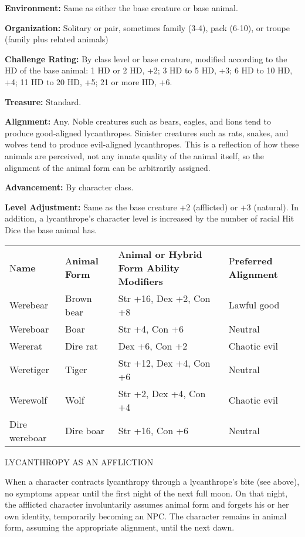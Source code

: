 \documentclass{article}
\begin{document}
\textbf{Environment:} Same as either the base creature or base animal.

\textbf{Organization:} Solitary or pair, sometimes family (3-4), pack (6-10), or 
troupe (family plus related animals)

\textbf{Challenge Rating:} By class level or base creature, modified according 
to the HD of the base animal: 1 HD or 2 HD, +2; 3 HD to 5 HD, +3; 6 HD to 10 HD, 
+4; 11 HD to 20 HD, +5; 21 or more HD, +6.

\textbf{Treasure:} Standard.

\textbf{Alignment:} Any. Noble creatures such as bears, eagles, and lions tend 
to produce good-aligned lycanthropes. Sinister creatures such as rats, snakes, 
and wolves tend to produce evil-aligned lycanthropes. This is a reflection of how 
these animals are perceived, not any innate quality of the animal itself, so the 
alignment of the animal form can be arbitrarily assigned.

\textbf{Advancement:} By character class.

\textbf{Level Adjustment:} Same as the base creature +2 (afflicted) or +3 (natural). 
In addition, a lycanthrope's character level is increased by the number of racial 
Hit Dice the base animal has.

\begin{tabular}{|>{\raggedright}p{47pt}|>{\raggedright}p{46pt}|>{\raggedright}p{138pt}|>{\raggedright}p{70pt}|}
\hline
\multicolumn{4}{|p{302pt}|}{C\textbf{ommon Lycanthropes}}\tabularnewline
\hline
N\textbf{ame} & A\textbf{nimal Form} & A\textbf{nimal or Hybrid Form Ability Modifiers} & P\textbf{referred 
Alignment}\tabularnewline
\hline
Werebear & Brown bear & Str +16, Dex +2, Con +8 & Lawful good\tabularnewline
\hline
Wereboar & Boar & Str +4, Con +6 & Neutral\tabularnewline
\hline
Wererat & Dire rat & Dex +6, Con +2 & Chaotic evil\tabularnewline
\hline
Weretiger & Tiger & Str +12, Dex +4, Con +6 & Neutral\tabularnewline
\hline
Werewolf & Wolf & Str +2, Dex +4, Con +4 & Chaotic evil\tabularnewline
\hline
Dire wereboar & Dire boar & Str +16, Con +6 & Neutral\tabularnewline
\hline
\end{tabular}

\vspace{12pt}
LYCANTHROPY AS AN AFFLICTION

When a character contracts lycanthropy through a lycanthrope's bite (see above), 
no symptoms appear until the first night of the next full moon. On that night, 
the afflicted character involuntarily assumes animal form and forgets his or her 
own identity, temporarily becoming an NPC. The character remains in animal form, 
assuming the appropriate alignment, until the next dawn.
\end{document}
